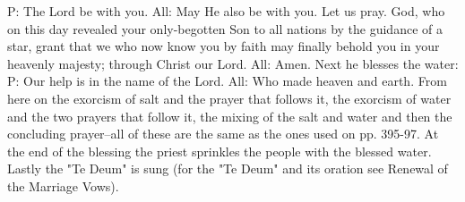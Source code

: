 P: The Lord be with you. 
All: May He also be with you.
Let us pray.
God, who on this day revealed your only-begotten Son to all nations by the guidance of a star, grant that we who now know you by faith may finally behold you in your heavenly majesty; through Christ our Lord. 
All: Amen.
Next he blesses the water: 
P: Our help is in the name of the Lord. 
All: Who made heaven and earth.
From here on the exorcism of salt and the prayer that follows it, the exorcism of water and the two prayers that follow it, the mixing of the salt and water and then the concluding prayer--all of these are the same as the ones used on pp. 395-97.
At the end of the blessing the priest sprinkles the people with the blessed water.
Lastly the "Te Deum" is sung (for the "Te Deum" and its oration see Renewal of the Marriage Vows).
